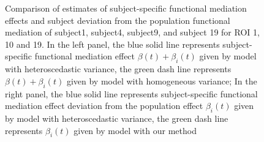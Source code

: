  \begin{figure}[h!]
\centering
\caption{Comparison of estimates of subject-specific functional mediation effects and subject deviation from the population functional mediation of subject1, subject4, subject9, and subject 19 for ROI 1, 10 and 19. In the left panel, the blue solid line represents subject-specific functional mediation effect $ \beta(t) + \beta_i(t)$ given by model with heteroscedastic variance, the green dash line represents $ \beta(t) + \beta_i(t)$ given by model with homogeneous variance; In the right panel, the blue solid line represents subject-specific functional mediation effect  deviation from the population effect $\beta_i(t)$ given by model with heteroscedastic variance, the green dash line represents $\beta_i(t)$ given by model with our method}
\label{voxel 4sub}
\end{figure}

